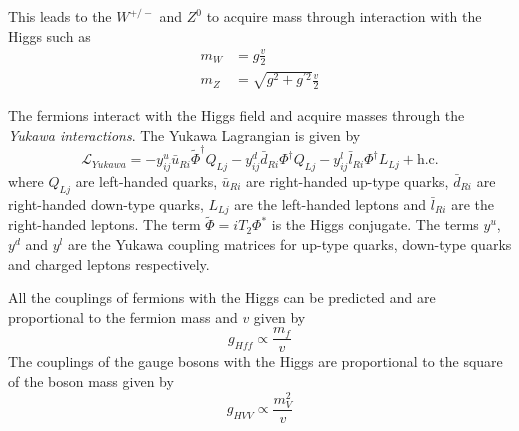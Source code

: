 This leads to the $W^{+/-}$ and $Z^0$ to acquire mass through interaction with the Higgs such as
\begin{equation}
  \begin{aligned}
    m_{W} &= g\frac{v}{2}\\
    m_{Z} &= \sqrt{g^2 + g^{\prime 2}}\frac{v}{2}
  \end{aligned}
\end{equation}

The fermions interact with the Higgs field and acquire masses through the \textit{Yukawa interactions}. The Yukawa Lagrangian is given by \cite{ILC_TDR_Vol2}
\begin{equation}
  \mathcal{L}_{Yukawa} = - y^u_{ij}\bar{u}_{Ri}\widetilde{\Phi}^{\dagger}Q_{Lj} - y^d_{ij}\bar{d}_{Ri}\Phi^{\dagger}Q_{Lj} - y^l_{ij}\bar{l}_{Ri}\Phi^{\dagger}L_{Lj} + \text{h.c}.
\end{equation}
where $Q_{Lj}$ are left-handed quarks, $\bar{u}_{Ri}$ are right-handed up-type quarks, $\bar{d}_{Ri}$ are right-handed down-type quarks, $L_{Lj}$ are the left-handed leptons and $\bar{l}_{Ri}$ are the right-handed leptons. The term $\widetilde{\Phi} = iT_2\Phi^{*}$ is the Higgs conjugate. The terms $y^u$, $y^d$ and $y^l$ are the Yukawa coupling matrices for up-type quarks, down-type quarks and charged leptons respectively.

All the couplings of fermions with the Higgs can be predicted and are proportional to the fermion mass and $v$ given by
\begin{equation}
g_{Hff} \propto \frac{m_f}{v}
\end{equation}
The couplings of the gauge bosons with the Higgs are proportional to the square of the boson mass given by
\begin{equation}
g_{HVV} \propto \frac{m_V^2}{v}
\end{equation}


